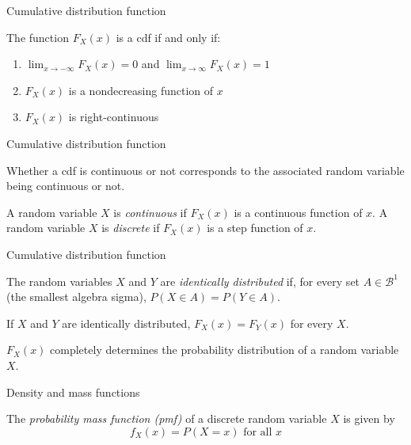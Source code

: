 \documentclass{beamer}
\begin{document}
\begin{frame}{Cumulative distribution function}

	The function $F_X(x)$ is a cdf if and only if:
	\begin{enumerate}
		\item $\lim_{x \rightarrow -\infty} F_X(x)=0$ and $\lim_{x \rightarrow \infty} F_X(x)=1$
		\item $F_X(x)$ is a nondecreasing function of $x$
		\item $F_X(x)$ is right-continuous
	\end{enumerate}

\end{frame}

\begin{frame}{Cumulative distribution function}

	Whether a cdf is continuous or not corresponds to the associated random variable being continuous or not.

	\begin{block}{}
		A random variable $X$ is \textit{continuous} if $F_X(x)$ is a continuous function of $x$. 
		A random variable $X$ is \textit{discrete} if $F_X(x)$ is a step function of $x$.
	\end{block}

\end{frame}

\begin{frame}{Cumulative distribution function}


	\begin{block}{}
		The random variables $X$ and $Y$ are \textit{identically distributed} if, for every set $A \in \mathcal{B}^1$ (the smallest algebra sigma), $P(X \in A) = P(Y \in A)$.
	\end{block}

	If $X$ and $Y$ are identically distributed, $F_X(x)=F_Y(x)$ for every $X$.

	$F_X(x)$ completely determines the probability distribution of a random variable $X$.

\end{frame}

\begin{frame}{Density and mass functions}

	\begin{block}{}
		The \textit{probability mass function (pmf)} of a discrete random variable $X$ is given by
		\begin{equation*}
			f_X(x) = P(X=x) \text{ for all } x
		\end{equation*}

	\end{block}

\end{frame}
\end{document}
